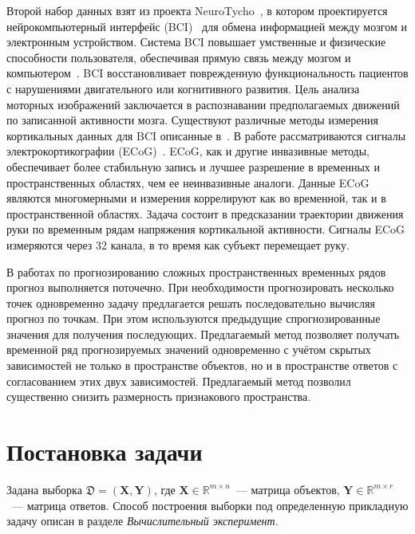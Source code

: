 \documentclass[12pt,twoside]{article}
\newcommand{\bY}{\mathbf{Y}}
\newcommand{\bX}{\mathbf{X}}
\begin{document}
Второй набор данных взят из проекта NeuroTycho~\cite{neurotycho}, в котором проектируется нейрокомпьютерный интерфейс (BCI)~\cite{millan2010combining,mason2007comprehensive} для обмена информацией между мозгом и электронным устройством. 
Система BCI повышает умственные и физические способности пользователя, обеспечивая прямую связь между мозгом и компьютером~\cite{millan2004brain}. 
BCI восстановливает поврежденную функциональность пациентов с нарушениями двигательного или когнитивного развития. 
Цель анализа моторных изображений заключается в распознавании предполагаемых движений по записанной активности мозга. 
Существуют различные методы измерения кортикальных данных для BCI описанные в~\cite{nicolas2012brain,amiri2013review}. 
В работе рассматриваются сигналы электрокортикографии (ECoG)~\cite{eliseyev2016penalized}. ECoG, как и другие инвазивные методы, обеспечивает более стабильную запись и лучшее разрешение в временных и пространственных областях, чем ее неинвазивные аналоги.
Данные ECoG являются многомерными и измерения коррелируют как во временной, так и в пространственной областях.
Задача состоит в предсказании траектории движения руки по временным рядам напряжения кортикальной активности. 
Сигналы ECoG измеряются через 32 канала, в то время как субъект перемещает руку. 

В работах по прогнозированию сложных пространственных временных рядов прогноз выполняется поточечно.
При необходимости прогнозировать несколько точек одновременно задачу предлагается решать последовательно вычисляя прогноз по точкам. При этом используются предыдущие спрогнозированные значения для получения последующих.
Предлагаемый метод позволяет получать временной ряд прогнозируемых значений одновременно с учётом скрытых зависимостей не только в пространстве объектов, но и в пространстве ответов с согласованием этих двух зависимостей.
Предлагаемый метод позволил существенно снизить размерность признакового пространства. 
 

\section{Постановка задачи}
Задана выборка $\mathfrak{D}= \left( \bX, \bY \right)$, где $\mathbf{X} \in \mathbb{R}^{m \times n}$~--- матрица объектов, $\mathbf{Y} \in \mathbb{R}^{m \times r}$~--- матрица ответов. 
Способ построения выборки под определенную прикладную задачу описан в разделе \textit{Вычислительный эксперимент}.
\end{document}
